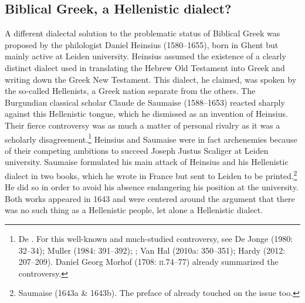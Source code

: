 \subsection{Biblical Greek, a Hellenistic dialect?}
\hypertarget{Toc19704832}{}
A different dialectal solution to the problematic status of Biblical Greek was proposed by the philologist Daniel Heinsius (1580–1655), born in Ghent but mainly active at Leiden university. Heinsius assumed the existence of a clearly distinct dialect used in translating the Hebrew Old Testament into Greek and writing down the Greek New Testament. This dialect, he claimed, was spoken by the so-called Hellenists, a Greek nation separate from the others. The Burgundian classical scholar Claude de Saumaise (1588–1653) reacted sharply against this Hellenistic tongue, which he dismissed as an invention of Heinsius. Their fierce controversy was as much a matter of personal rivalry as it was a scholarly disagreement.\footnote{De \citet[32]{Jonge1980}. For this well-known and much-studied controversy, see De Jonge (1980: 32–34); Muller (1984: 391–392); \citet{Considine2010}; Van Hal (2010a: 350–351); Hardy (2012: 207–209). Daniel Georg Morhof (1708: \textsc{ii.}74–77) already summarized the controversy.} Heinsius and Saumaise were in fact archenemies because of their competing ambitions to succeed Joseph Justus Scaliger at Leiden university. Saumaise formulated his main attack of Heinsius and his Hellenistic dialect in two books, which he wrote in France but sent to Leiden to be printed.\footnote{Saumaise (1643a \& 1643b). The preface of \citet{Saumaise1639} already touched on the issue too.} He did so in order to avoid his absence endangering his position at the university. Both works appeared in 1643 and were centered around the argument that there was no such thing as a Hellenistic people, let alone a Hellenistic dialect.


